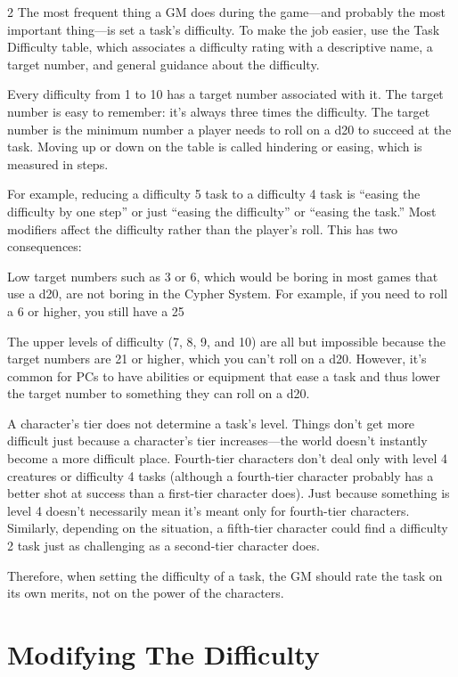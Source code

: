 \begin{multicols}{2}
The most frequent thing a GM does during the game—and probably the most important thing—is set a task’s difficulty. To make the job easier, use the Task Difficulty table, which associates a difficulty rating with a descriptive name, a target number, and general guidance about the difficulty.

Every difficulty from 1 to 10 has a target number associated with it. The target number is easy to remember: it’s always three times the difficulty. The target number is the minimum number a player needs to roll on a d20 to succeed at the task. Moving up or down on the table is called hindering or easing, which is measured in steps.

For example, reducing a difficulty 5 task to a difficulty 4 task is “easing the difficulty by one step” or just “easing the difficulty” or “easing the task.” Most modifiers affect the difficulty rather than the player’s roll. This has two consequences:

Low target numbers such as 3 or 6, which would be boring in most games that use a d20, are not boring in the Cypher System. For example, if you need to roll a 6 or higher, you still have a 25%

The upper levels of difficulty (7, 8, 9, and 10) are all but impossible because the target numbers are 21 or higher, which you can’t roll on a d20. However, it’s common for PCs to have abilities or equipment that ease a task and thus lower the target number to something they can roll on a d20.

A character’s tier does not determine a task’s level. Things don’t get more difficult just because a character’s tier increases—the world doesn’t instantly become a more difficult place. Fourth-tier characters don’t deal only with level 4 creatures or difficulty 4 tasks (although a fourth-tier character probably has a better shot at success than a first-tier character does). Just because something is level 4 doesn’t necessarily mean it’s meant only for fourth-tier characters. Similarly, depending on the situation, a fifth-tier character could find a difficulty 2 task just as challenging as a second-tier character does.

Therefore, when setting the difficulty of a task, the GM should rate the task on its own merits, not on the power of the characters.

\section{Modifying The Difficulty}


\end{multicols}
